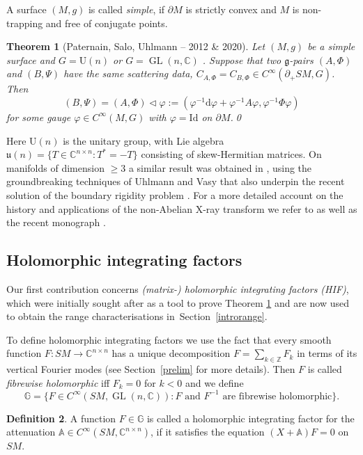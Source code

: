 \documentclass[JEP,XML,SOM,Unicode,published]{cedram}
\DeclareMathOperator{\GL}{GL}
\newcommand{\rU}{\mathrm{U}}
\theoremstyle{plain}
\newtheorem{theorem}{Theorem}[section]
\theoremstyle{definition}
\newtheorem{definition}[theorem]{Definition}
\newcommand{\A}{\mathbb{A}}
\newcommand{\G}{\mathbb{G}}
\newcommand{\Z}{\mathbb{Z}}
\newcommand{\C}{\mathbb{C}}
\newcommand{\g}{\mathfrak{g}}
\renewcommand{\u}{\mathfrak{u}}
\renewcommand{\d}{\mathrm{d}}
\newcommand{\Id}{\mathrm{Id}}
\newcommand{\1}{{\bf 1}}
\let\act\triangleleft
\begin{document}
A surface $(M,g)$ is called \emph{simple}, if $\partial M$ is strictly convex and $M$ is non-trapping and free of conjugate points.

\begin{theorem}[Paternain, Salo, Uhlmann -- 2012 \& 2020]\label{PSU} Let $(M,g)$ be a simple surface and $G=\rU(n)$ \cite{PSU12} or $G=\GL(n,\C)$ \cite{PaSa20}. Suppose that two $\g$-pairs $(A,\Phi)$ and $(B,\Psi)$ have the same scattering data, $C_{A,\Phi}=C_{B,\Phi}\in C^\infty(\partial_+SM,G)$. Then
\begin{equation*}
(B,\Psi) = (A,\Phi)\act\varphi := (\varphi^{-1} \d \varphi + \varphi^{-1} A \varphi,\varphi^{-1} \Phi \varphi)
\end{equation*}
for some gauge $\varphi\in C^\infty(M,G)$ with $\varphi = \Id$ on $\partial M$.\qed
\end{theorem}

Here $\rU(n)$ is the unitary group, with Lie algebra $\u(n)=\{T\in \C^{n\times n}:T^*=-T\}$ consisting of skew-Hermitian matrices. On manifolds of dimension $\ge 3$ a similar result was obtained in \cite{PSUZ19}, using the groundbreaking techniques of Uhlmann and Vasy \cite{UhVa16} that also underpin the recent solution of the boundary rigidity problem \cite{SUV21}.
For a more detailed account on the history and applications of the non-Abelian X-ray transform we refer to \cite{PaSa20,Nov19} as well as the recent monograph \cite{PSU20}.

\subsection{Holomorphic integrating factors} Our first contribution concerns \emph{\mbox{(matrix-)} holomorphic integrating factors (HIF)}, which were initially sought after as a tool to prove Theorem \ref{PSU} and are now used to obtain the range characterisations in~Section~\ref{introrange}.

To define holomorphic integrating factors we use the fact that every smooth function $F:SM\to \C^{n\times n}$ has a unique decomposition $F=\sum_{k\in \Z}F_k$ in terms of its vertical Fourier modes (see Section~\ref{prelim} for more details). Then $F$ is called \emph{fibrewise holomorphic} iff $F_k=0$ for $k<0$ and we define
\begin{equation}\label{defG}
\G =\{F\in C^\infty(SM,\GL(n,\C)):F\text{ and } F^{-1} \text{ are fibrewise holomorphic}\}.
\end{equation}
\begin{definition}
A function $F\in \G$ is called a holomorphic integrating factor for the attenuation $\A\in C^\infty(SM,\C^{n\times n})$, if it satisfies the equation $(X+\A)F=0$ on~$SM$.
\end{definition}
\end{document}

